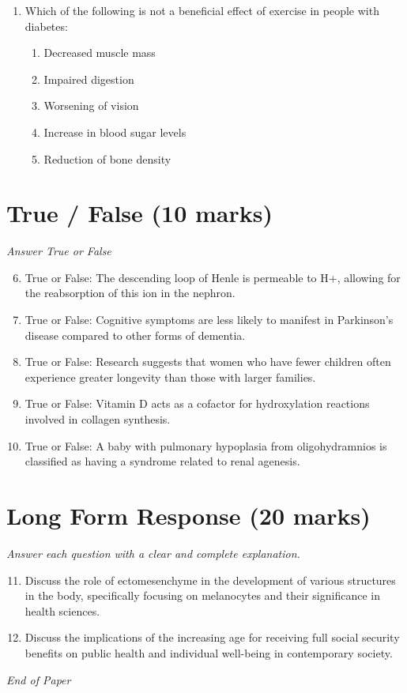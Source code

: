 \documentclass[12pt]{article}
\begin{document}
\begin{enumerate}[label=\arabic*.]
\begin{enumerate}[label=(\alph*)]
    \item 20-30 minutes.
    \item 1-2 seconds.
    \item 10-15 minutes.
    \item 30-40 seconds.
    \item 90-100 seconds.
\end{enumerate}
\item Which of the following is not a beneficial effect of exercise in people with diabetes:
\begin{enumerate}[label=(\alph*)]
    \item Decreased muscle mass
    \item Impaired digestion
    \item Worsening of vision
    \item Increase in blood sugar levels
    \item Reduction of bone density
\end{enumerate}
\end{enumerate}

\section*{True / False (10 marks)}
\textit{Answer True or False}
\begin{enumerate}[label=\arabic*.]
\setcounter{enumi}{5}
\item True or False: The descending loop of Henle is permeable to H+, allowing for the reabsorption of this ion in the nephron.
\item True or False: Cognitive symptoms are less likely to manifest in Parkinson's disease compared to other forms of dementia.
\item True or False: Research suggests that women who have fewer children often experience greater longevity than those with larger families.
\item True or False: Vitamin D acts as a cofactor for hydroxylation reactions involved in collagen synthesis.
\item True or False: A baby with pulmonary hypoplasia from oligohydramnios is classified as having a syndrome related to renal agenesis.
\end{enumerate}

\section*{Long Form Response (20 marks)}
\textit{Answer each question with a clear and complete explanation.}
\begin{enumerate}[label=\arabic*.]
\setcounter{enumi}{10}
\item Discuss the role of ectomesenchyme in the development of various structures in the body, specifically focusing on melanocytes and their significance in health sciences.
\item Discuss the implications of the increasing age for receiving full social security benefits on public health and individual well-being in contemporary society.
\end{enumerate}

\vfill
\noindent\textit{End of Paper}
\end{document}
